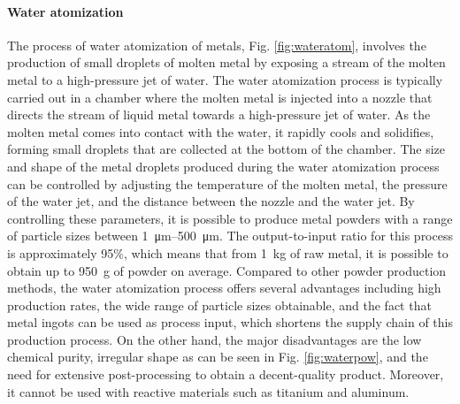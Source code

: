 \paragraph{Water atomization}The process of water atomization of metals, Fig. \ref{fig:wateratom}, involves the production of small droplets of molten metal by exposing a stream of the molten metal to a high-pressure jet of water. The water atomization process is typically carried out in a chamber where the molten metal is injected into a nozzle that directs the stream of liquid metal towards a high-pressure jet of water. As the molten metal comes into contact with the water, it rapidly cools and solidifies, forming small droplets that are collected at the bottom of the chamber. The size and shape of the metal droplets produced during the water atomization process can be controlled by adjusting the temperature of the molten metal, the pressure of the water jet, and the distance between the nozzle and the water jet. By controlling these parameters, it is possible to produce metal powders with a range of particle sizes between \SIrange[range-phrase = --]{1}{500}{\micro\metre}. The output-to-input ratio for this process is approximately 95\%, which means that from \SI{1}{\kilo\gram} of raw metal, it is possible to obtain up to \SI{950}{\gram} of powder on average. Compared to other powder production methods, the water atomization process offers several advantages including high production rates, the wide range of particle sizes obtainable, and the fact that metal ingots can be used as process input, which shortens the supply chain of this production process. On the other hand, the major disadvantages are the low chemical purity, irregular shape as can be seen in Fig. \ref{fig:waterpow}, and the need for extensive post-processing to obtain a decent-quality product. Moreover, it cannot be used with reactive materials such as titanium and aluminum.

